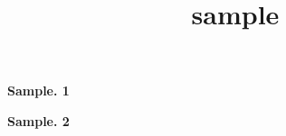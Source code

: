 \documentclass[dvipdfmx]{article}
\title{sample}
\begin{document}
\begin{itembox}[l]{\textbf{Sample. 1}}
    \begin{center}
        \scalebox{1}{}
    \end{center}
    \vspace{1em}
    \begin{center}
        \scalebox{1}{}
    \end{center}
    \vspace{1em}
    \begin{center}
        \scalebox{1}{}
    \end{center}
    \vspace{1em}
    \begin{center}
        \scalebox{1}{}
    \end{center}
\end{itembox}

\begin{itembox}[l]{\textbf{Sample. 2}}
    \begin{center}
        \scalebox{1}{}
    \end{center}
    \vspace{1em}
    \begin{center}
        \scalebox{1}{}
      \end{center}
\end{itembox}
\end{document}
